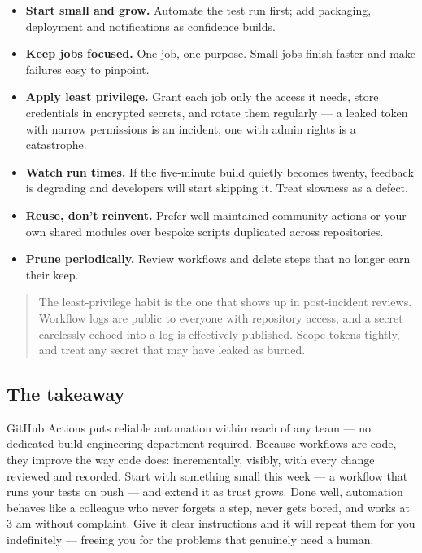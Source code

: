 \begin{itemize}[leftmargin=*]
\item \textbf{Start small and grow.} Automate the test run first; add packaging, deployment and notifications as confidence builds.
\item \textbf{Keep jobs focused.} One job, one purpose. Small jobs finish faster and make failures easy to pinpoint.
\item \textbf{Apply least privilege.} Grant each job only the access it needs, store credentials in encrypted secrets, and rotate them regularly — a leaked token with narrow permissions is an incident; one with admin rights is a catastrophe.
\item \textbf{Watch run times.} If the five-minute build quietly becomes twenty, feedback is degrading and developers will start skipping it. Treat slowness as a defect.
\item \textbf{Reuse, don't reinvent.} Prefer well-maintained community actions or your own shared modules over bespoke scripts duplicated across repositories.
\item \textbf{Prune periodically.} Review workflows and delete steps that no longer earn their keep.
\end{itemize}


\begin{quote}\small
The least-privilege habit is the one that shows up in post-incident reviews. Workflow logs are public to everyone with repository access, and a secret carelessly echoed into a log is effectively published. Scope tokens tightly, and treat any secret that may have leaked as burned.
\end{quote}



\subsection{The takeaway}


GitHub Actions puts reliable automation within reach of any team — no dedicated build-engineering department required. Because workflows are code, they improve the way code does: incrementally, visibly, with every change reviewed and recorded. Start with something small this week — a workflow that runs your tests on push — and extend it as trust grows. Done well, automation behaves like a colleague who never forgets a step, never gets bored, and works at 3 am without complaint. Give it clear instructions and it will repeat them for you indefinitely — freeing you for the problems that genuinely need a human.

